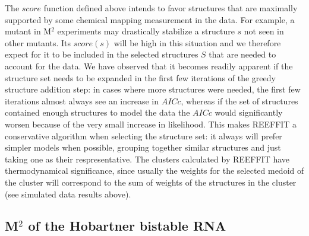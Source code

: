\documentclass[12pt]{article}
\begin{document}
The $score$ function defined above intends to favor structures that are maximally supported by some chemical mapping measurement in the data. 
For example, a mutant in M$^2$ experiments may drastically stabilize a structure $s$ not seen in other mutants. 
Its $score(s)$ will be high in this situation and we therefore expect for it to be included in the selected structures $S$ that are needed to account for the data. 
We have observed that it becomes readily apparent if the structure set needs to be expanded in the first few iterations of the greedy structure addition step: in cases where more structures were needed, the first few iterations almost always see an increase in $AICc$, whereas if the set of structures contained enough structures to model the data the $AICc$ would significantly worsen because of the very small increase in likelihood. 
This makes REEFFIT a conservative algorithm when selecting the structure set: it always will prefer simpler models when possible, grouping together similar structures and just taking one as their respresentative. 
The clusters calculated by REEFFIT have thermodynamical significance, since usually the weights for the selected medoid of the cluster will correspond to the sum of weights of the structures in the cluster (see simulated data results above).

\subsection{M$^2$ of the Hobartner bistable RNA}
\end{document}
